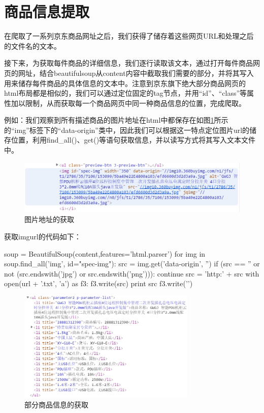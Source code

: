 \section{商品信息提取}
在爬取了一系列京东商品网址之后，我们获得了储存着这些网页URL和处理之后的文件名的文本。

接下来，为获取每件商品的详细信息，我们逐行读取该文本，通过打开每件商品网页的网址，结合beautifulsoup从content内容中截取我们需要的部分，并将其写入用来储存每件商品的具体信息的文本中。注意到京东旗下绝大部分商品网页的html布局都是相似的，我们可以通过定位固定的tag节点，并用“id”、“class”等属性加以限制，从而获取每一个商品网页中同一种商品信息的位置，完成爬取。

例如：我们观察到所有描述商品的图片地址在html中都保存在如图\ref{img:dsw1}所示的“img”标签下的“data-origin”类中，因此我们可以根据这一特点定位图片url的储存位置，利用find\_all()、get()等语句获取信息，并以读写方式将其写入文本文件中。

\begin{figure}[htbp]
\centering
\includegraphics[width=13.5cm]{img/dsw/dsw1.png}
\caption{图片地址的获取}
\label{img:dsw1}
\end{figure}

获取imgurl的代码如下：
\begin{python}
    soup = BeautifulSoup(content,features='html.parser')
    for img in soup.find_all('img', id="spec-img"):
        src = img.get('data-origin', '')
        if (src == '' or not (src.endswith('jpg') or src.endswith('png'))):
            continue
        src = 'http:' + src
        with open(url + '.txt', 'a') as f3:
            f3.write(src)
            print src
            f3.write('\n')
\end{python}

\begin{figure}[htbp]
\centering
\includegraphics[width=8.5cm]{img/dsw/dsw2.png}
\caption{部分商品信息的获取}
\label{img:dsw2}
\end{figure}

